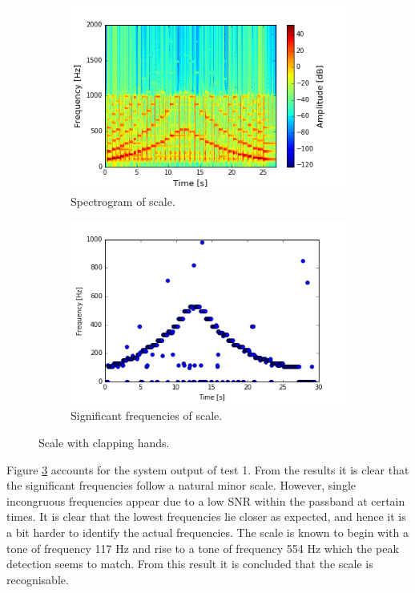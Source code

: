 \begin{figure}[H]
\centering
\begin{subfigure}{0.49\textwidth}
\centering
\includegraphics[width=\textwidth]{figures/validation/systemtest/final_spec1.png}
\caption{Spectrogram of scale.}
\label{fig:final_spec1}
\end{subfigure}
\begin{subfigure}{0.49\textwidth}
\centering
\includegraphics[width=\textwidth]{figures/validation/systemtest/final_peak1.png}
\caption{Significant frequencies of scale.}
\label{fig:final_peak1}
\end{subfigure}
\caption{Scale with clapping hands.}
\label{fig:final_1}
\end{figure} 

Figure \ref{fig:final_1} accounts for the system output of test 1. From the results it is clear that the significant frequencies follow a natural minor scale. However, single incongruous frequencies appear due to a low SNR within the passband at certain times.
It is clear that the lowest frequencies lie closer as expected, and hence it is a bit harder to identify the actual frequencies. The scale is known to begin with a tone of frequency 117 Hz and rise to a tone of frequency 554 Hz which the peak detection seems to match. From this result it is concluded that the scale is recognisable.

